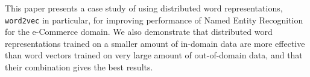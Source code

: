 This paper presents a case study of using distributed word representations, \texttt{word2vec} in particular, for improving performance of Named Entity Recognition for the e-Commerce domain. We also demonstrate that distributed word representations trained on a smaller amount of in-domain data are more effective than word vectors trained on very large amount of out-of-domain data, and that their combination gives the best results.
